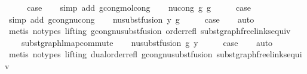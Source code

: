 \begin{isabellebody}
\ \ \isamarkupfalse%
\ \isamarkupfalse%
\ {\isacharquery}{\kern0pt}case\isanewline
\ \ \isamarkupfalse%
\ {\isacharparenleft}{\kern0pt}simp\ add{\isacharcolon}{\kern0pt}\ gcong{\isachardot}{\kern0pt}mol{\isacharunderscore}{\kern0pt}cong{\isacharparenright}{\kern0pt}\isanewline
{}\isamarkupfalse%
\isanewline
\ \ \isamarkupfalse%
\ {\isacharparenleft}{\kern0pt}nu{\isacharunderscore}{\kern0pt}cong\ g\ g{\isacharprime}{\kern0pt}{\isacharparenright}{\kern0pt}\isanewline
\ \ \isamarkupfalse%
\ \isamarkupfalse%
\ {\isacharquery}{\kern0pt}case\isanewline
\ \ \isamarkupfalse%
\ {\isacharparenleft}{\kern0pt}simp\ add{\isacharcolon}{\kern0pt}\ gcong{\isachardot}{\kern0pt}nu{\isacharunderscore}{\kern0pt}cong{\isacharparenright}{\kern0pt}\isanewline
{}\isamarkupfalse%
\isanewline
\ \ \isamarkupfalse%
\ {\isacharparenleft}{\kern0pt}nu{\isacharunderscore}{\kern0pt}subst{\isacharunderscore}{\kern0pt}fusion{}\ y\ g{\isacharparenright}{\kern0pt}\isanewline
\ \ \isamarkupfalse%
\ \isamarkupfalse%
\ {\isacharquery}{\kern0pt}case\isanewline
\ \ \isamarkupfalse%
\ auto\isanewline
\ \ \isamarkupfalse%
\ {\isacharparenleft}{\kern0pt}metis\ {\isacharparenleft}{\kern0pt}no{\isacharunderscore}{\kern0pt}types{\isacharcomma}{\kern0pt}\ lifting{\isacharparenright}{\kern0pt}\ gcong{\isachardot}{\kern0pt}nu{\isacharunderscore}{\kern0pt}subst{\isacharunderscore}{\kern0pt}fusion{}\ order{\isacharunderscore}{\kern0pt}refl\ subst{\isacharunderscore}{\kern0pt}graph{\isacharunderscore}{\kern0pt}freelinks{\isacharunderscore}{\kern0pt}equiv\isanewline
\ \ \ \ subst{\isacharunderscore}{\kern0pt}graph{\isacharunderscore}{\kern0pt}lmap{\isacharunderscore}{\kern0pt}commute{\isacharparenright}{\kern0pt}\isanewline
{}\isamarkupfalse%
\isanewline
\ \ \isamarkupfalse%
\ {\isacharparenleft}{\kern0pt}nu{\isacharunderscore}{\kern0pt}subst{\isacharunderscore}{\kern0pt}fusion{}\ g\ y{\isacharparenright}{\kern0pt}\isanewline
\ \ \isamarkupfalse%
\ \isamarkupfalse%
\ {\isacharquery}{\kern0pt}case\isanewline
\ \ \isamarkupfalse%
\ auto\isanewline
\ \ \isamarkupfalse%
\ {\isacharparenleft}{\kern0pt}metis\ {\isacharparenleft}{\kern0pt}no{\isacharunderscore}{\kern0pt}types{\isacharcomma}{\kern0pt}\ lifting{\isacharparenright}{\kern0pt}\ dual{\isacharunderscore}{\kern0pt}order{\isachardot}{\kern0pt}refl\ gcong{\isachardot}{\kern0pt}nu{\isacharunderscore}{\kern0pt}subst{\isacharunderscore}{\kern0pt}fusion{}\ subst{\isacharunderscore}{\kern0pt}graph{\isacharunderscore}{\kern0pt}freelinks{\isacharunderscore}{\kern0pt}equiv\isanewline

\end{isabellebody}
